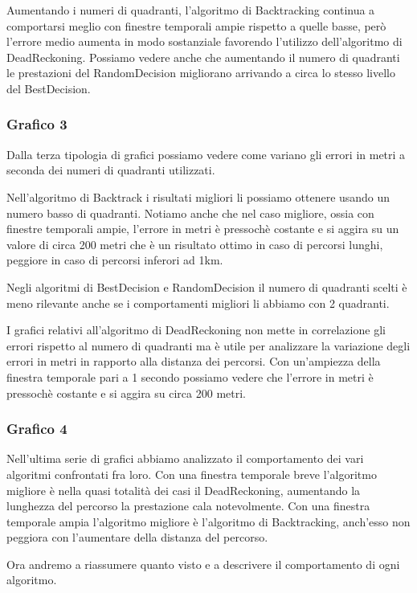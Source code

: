 \documentclass[12pt,a4paper,openright,twoside]{report}
\begin{document}
Aumentando i numeri di quadranti, l'algoritmo di Backtracking continua a comportarsi meglio con finestre temporali ampie rispetto a quelle basse, però l'errore medio aumenta in modo sostanziale favorendo l'utilizzo dell'algoritmo di DeadReckoning. Possiamo vedere anche che aumentando il numero di quadranti le prestazioni del RandomDecision migliorano arrivando a circa lo stesso livello del BestDecision.

\subsubsection{Grafico 3}
Dalla terza tipologia di grafici possiamo vedere come variano gli errori in metri a seconda dei numeri di quadranti utilizzati.

Nell'algoritmo di Backtrack i risultati migliori li possiamo ottenere usando un numero basso di quadranti. Notiamo anche che nel caso migliore, ossia con finestre temporali ampie, l'errore in metri è pressochè costante e si aggira su un valore di circa 200 metri che è un risultato ottimo in caso di percorsi lunghi, peggiore in caso di percorsi inferori ad 1km.

Negli algoritmi di BestDecision e RandomDecision il numero di quadranti scelti è meno rilevante anche se i comportamenti migliori li abbiamo con 2 quadranti.

I grafici relativi all'algoritmo di DeadReckoning non mette in correlazione gli errori rispetto al numero di quadranti ma è utile per analizzare la variazione degli errori in metri in rapporto alla distanza dei percorsi. Con un'ampiezza della finestra temporale pari a 1 secondo possiamo vedere che l'errore in metri è pressochè costante e si aggira su circa 200 metri.

\subsubsection{Grafico 4}
Nell'ultima serie di grafici abbiamo analizzato il comportamento dei vari algoritmi confrontati fra loro.
Con una finestra temporale breve l'algoritmo migliore è nella quasi totalità dei casi il DeadReckoning, aumentando la lunghezza del percorso la prestazione cala notevolmente.
Con una finestra temporale ampia l'algoritmo migliore è l'algoritmo di Backtracking, anch'esso non peggiora con l'aumentare della distanza del percorso.

\medskip
Ora andremo a riassumere quanto visto e a descrivere il comportamento di ogni algoritmo.
\end{document}

